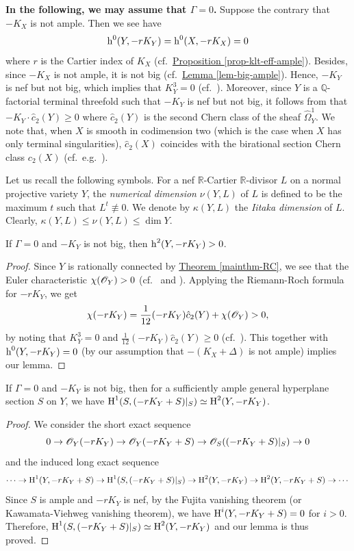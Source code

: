 \textbf{In the following, we may assume that $\Gamma=0$.} 
Suppose the contrary that $-K_X$ is not ample.
Then we see have
$$\operatorname{h}^0(Y,-rK_Y)=\operatorname{h}^0(X,-rK_X)=0$$ 
where $r$ is the Cartier index of $K_X$ (cf.~{\hyperref[prop-klt-eff-ample]{Proposition \ref*{prop-klt-eff-ample}}}). 
Besides, since $-K_X$ is not ample, it is not big (cf.~{\hyperref[lem-big-ample]{Lemma \ref*{lem-big-ample}}}). 
Hence, $-K_Y$ is nef but not big, which implies that $K_Y^3=0$ (cf.~\cite[Proposition 2.61]{KM98}).  
Moreover, since $Y$ is a $\mathbb{Q}$-factorial terminal threefold such that $-K_Y$ is nef but not big, it follows from \cite[Corollary 6.2]{KMM94} that $-K_Y\cdot \hat{c}_2(Y)\geqslant 0$ where $\hat{c}_2(Y)$ is the second Chern class of the sheaf $\hat{\Omega}_Y^1$.
We note that, when $X$ is smooth in codimension two (which is the case when $X$ has only terminal singularities), $\hat{c}_2(X)$ coincides with the birational section Chern class $c_2(X)$ (cf.~e.g.~\cite[Proof of Claim 4.11]{GKP16b}).

Let us recall the following symbols.  
For a nef $\mathbb{R}$-Cartier $\mathbb{R}$-divisor $L$ on a normal projective variety $Y$,  the 
\textit{numerical dimension} $\nu(Y,L)$ of $L$ is defined to be the maximum $t$ such that $L^t\not\equiv0$.
We denote by $\kappa(Y,L)$ the \textit{Iitaka dimension} of $L$. 
Clearly, 
$\kappa(Y,L)\leqslant\nu(Y,L)\leqslant\dim Y$.   


\begin{lemme}\label{lem-gamma0-h2>0}
If $\Gamma=0$ and $-K_Y$ is not big, then $\operatorname{h}^2(Y,-rK_Y)>0$.
\end{lemme}
\begin{proof}
Since $Y$ is rationally connected by {\hyperref[mainthm-RC]{Theorem \ref*{mainthm-RC}}}, we see that the Euler characteristic $\chi(\mathscr O_Y)>0$ (cf.~\cite[Corollary 4.18]{Deb01} and \cite[Theorem 5.22]{KM98}).
Applying the Riemann-Roch formula for $-rK_Y$, we get
$$\chi(-rK_Y)=\frac{1}{12}(-rK_Y)\hat{c}_2(Y)+\chi(\mathscr O_Y)>0,$$
by noting that $K_Y^3=0$ and $\frac{1}{12}(-rK_Y)\hat{c}_2(Y)\geqslant 0$ (cf.~\cite[Corollary 6.2]{KMM94}).
This together with $\operatorname{h}^0(Y,-rK_Y)=0$ (by our assumption that $-(K_X+\Delta)$ is not ample) implies our lemma.	
\end{proof}


\begin{lemme}\label{lem-gamma0-h1=h2}
If $\Gamma=0$ and $-K_Y$ is not big, then for a sufficiently ample general hyperplane section $S$ on $Y$, we have $\operatorname{H}^1(S,(-rK_Y+S)|_S)\simeq\operatorname{H}^2(Y,-rK_Y)$.
\end{lemme}
\begin{proof}
We consider the short exact sequence $$0\to\mathscr O_Y(-rK_Y)\to\mathscr O_Y(-rK_Y+S)\to\mathscr O_S((-rK_Y+S)|_S)\to 0$$ 
and the induced long exact sequence
$$\cdots\to \operatorname{H}^1(Y,-rK_Y+S)\to \operatorname{H}^1(S,(-rK_Y+S)|_S)\to \operatorname{H}^2(Y,-rK_Y)\to \operatorname{H}^2(Y,-rK_Y+S)\to\cdots$$
Since $S$ is ample and $-rK_Y$ is nef, by the Fujita vanishing theorem (or Kawamata-Viehweg vanishing theorem), we have $\operatorname{H}^i(Y,-rK_Y+S)=0$ for $i>0$.
Therefore,  $\operatorname{H}^1(S,(-rK_Y+S)|_S)\simeq\operatorname{H}^2(Y,-rK_Y)$ and our lemma is thus proved.
\end{proof}

